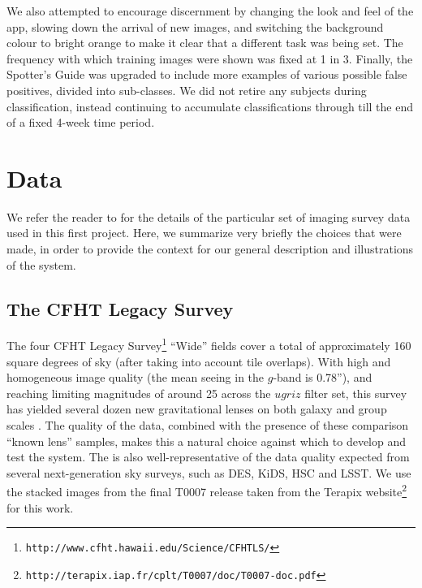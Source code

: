 \documentclass[useAMS,usenatbib,a4paper]{mn2e}
\begin{document}
We also attempted to encourage discernment by changing the look and feel of the
app, slowing down the arrival of new images, and switching the background colour
to bright orange to make it clear that a different task was being set. The
frequency with which training images were shown was fixed at 1 in 3. Finally,
the Spotter's Guide was upgraded to include more examples of various possible
false positives, divided into sub-classes. We did not retire any subjects during
\StageTwo classification, instead continuing to accumulate classifications
through till the end of a fixed 4-week time period.



\section{Data}
\label{sec:data}

We refer the reader to \PaperTwo for the details of the particular set of
imaging survey data used in this first \SW project. Here, we summarize very
briefly the choices that were made, in order to provide the context for our
general description and illustrations of the \SW system.


\subsection{The CFHT Legacy Survey}
\label{sec:data:CFHTLS}

The four CFHT Legacy Survey\footnote{\texttt{http://www.cfht.hawaii.edu/Science/CFHTLS/}}
\citep[\cfhtls,][]{Gwyn2012} ``Wide'' fields cover a total of approximately
160 square degrees of sky (after taking into account tile overlaps).
With high and homogeneous image quality (the mean seeing in the $g$-band is
0.78''), and reaching limiting magnitudes of around 25 across the $ugriz$ filter
set, this survey has yielded several dozen new gravitational lenses on both
galaxy and group scales
\citep{GavazziEtal2014,SonnenfeldEtal13,CabanacEtal2007,MoreEtal2012}. The
quality of the data, combined with the presence of these comparison ``known
lens'' samples, makes this a natural choice against which to develop and test
the \SW system. The \cfhtls is also well-representative of the data quality
expected from several next-generation sky surveys, such as DES, KiDS, HSC and
LSST. We use the stacked images
from the final T0007 release taken from the Terapix
website\footnote{\texttt{http://terapix.iap.fr/cplt/T0007/doc/T0007-doc.pdf}} for this
work.
\end{document}
